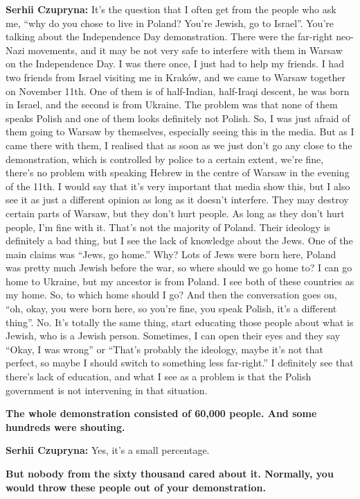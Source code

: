 \textbf{Serhii Czupryna:} It’s the question that I often get from the people who ask me, ``why do you chose to live in Poland? You’re Jewish, go to Israel''. You’re talking about the Independence Day demonstration. There were the far-right neo-Nazi movements, and it may be not very safe to interfere with them in Warsaw on the Independence Day. I was there once, I just had to help my friends. I had two friends from Israel visiting me in Kraków, and we came to Warsaw together on  November 11th. One of them is of half-Indian, half-Iraqi descent, he was born in Israel, and the second is from Ukraine. The problem was that none of them speaks Polish and one of them looks definitely not Polish. So, I was just afraid of them going to Warsaw by themselves, especially seeing this in the media. But as I came there with them, I realised that as soon as we just don’t go any close to the demonstration, which is controlled by police to a certain extent, we’re fine, there’s no problem with speaking Hebrew in the centre of Warsaw in the evening of the 11th. I would say that it’s very important that media show this, but I also see it as just a different opinion as long as it doesn’t interfere. They may destroy certain parts of Warsaw, but they don’t hurt people. As long as they don’t hurt people, I’m fine with it. That’s not the majority of Poland. Their ideology is definitely a bad thing, but I see the lack of knowledge about the Jews. One of the main claims was ``Jews, go home.'' Why? Lots of Jews were born here, Poland was pretty much Jewish before the war, so where should we go home to? I can go home to Ukraine, but my ancestor is from Poland. I see both of these countries as my home. So, to which home should I go? And then the conversation goes on, ``oh, okay, you were born here, so you’re fine, you speak Polish, it’s a different thing''. No. It’s totally the same thing, start educating those people about what is Jewish, who is a Jewish person. Sometimes, I can open their eyes and they say ``Okay, I was wrong'' or ``That’s probably the ideology, maybe it’s not that perfect, so maybe I should switch to something less far-right.'' I definitely see that there’s lack of education, and what I see as a problem is that the Polish government is not intervening in that situation. \par
\textbf{The whole demonstration consisted of 60,000 people. And some hundreds were shouting.}\par 
\textbf{Serhii Czupryna:} Yes, it’s a small percentage. \par
\textbf{But nobody from the sixty thousand cared about it. Normally, you would throw these people out of your demonstration.} \par 
